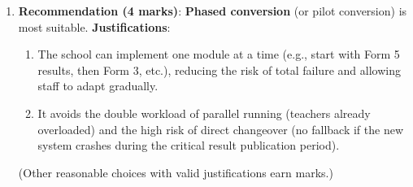 \documentclass[11pt]{article}
\begin{document}
\begin{corrige}
\begin{enumerate}
\begin{itemize}
\item \textbf{Pilot conversion}: New system is tried in one part of the organisation (e.g., one form/class) before full rollout. Limits risk, provides real feedback.
\end{itemize}
\item \textbf{Recommendation (4 marks)}: \textbf{Phased conversion} (or pilot conversion) is most suitable.
\textbf{Justifications}:
\begin{enumerate}
\item The school can implement one module at a time (e.g., start with Form 5 results, then Form 3, etc.), reducing the risk of total failure and allowing staff to adapt gradually.
\item It avoids the double workload of parallel running (teachers already overloaded) and the high risk of direct changeover (no fallback if the new system crashes during the critical result publication period).
\end{enumerate}
(Other reasonable choices with valid justifications earn marks.)
\end{enumerate}
\end{corrige}
\end{document}
